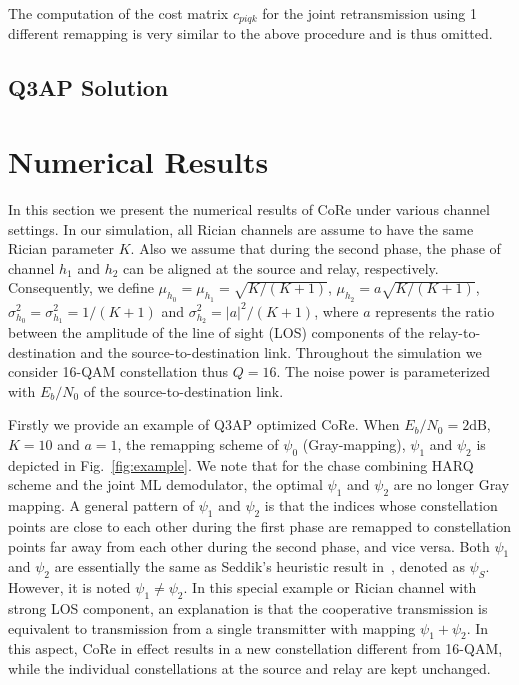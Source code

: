 \documentclass[conference]{IEEEtran}
\begin{document}
The computation of the cost matrix $c_{piqk}$ for the joint
retransmission using 1 different remapping is very similar to the above
procedure and is thus omitted.
\subsection{Q3AP Solution}

\section{Numerical Results}
\label{sec:simulation}
In this section we present the numerical results of CoRe under various channel
settings. In our simulation, all Rician channels are assume to have the same
Rician parameter $K$. Also we assume that during the second phase, the phase of
channel $h_1$ and $h_2$ can be aligned at the source and relay, respectively.
Consequently, we define $\mu_{h_0} = \mu_{h_1} = \sqrt{K/(K + 1)}$,
$\mu_{h_2}=a\sqrt{K/(K + 1)}$,  $\sigma_{h_0}^2 = \sigma_{h_1}^2 = 1/(K+1)$ and
$\sigma_{h_2}^2 = |a|^2/(K+1)$, where $a$ represents the ratio
between the amplitude of the line of sight (LOS) components of the
relay-to-destination and the source-to-destination link. Throughout the
simulation we consider 16-QAM constellation thus $Q=16$. The noise power is
parameterized with $E_b/N_0$ of the source-to-destination link.

Firstly we provide an example of Q3AP optimized CoRe. When $E_b/N_0 =
2\mbox{dB}$, $K = 10$ and $a = 1$, the remapping scheme of $\psi_0$
(Gray-mapping), $\psi_1$ and $\psi_2$ is depicted in Fig.~\ref{fig:example}. We
note that for the chase combining HARQ scheme and the joint ML demodulator, the
optimal $\psi_1$ and $\psi_2$ are no longer Gray mapping. A general pattern of
$\psi_1$ and $\psi_2$ is that the indices whose constellation points are close
to each other during the first phase are remapped to constellation points far
away from each other during the second phase, and vice versa. Both $\psi_1$ and
$\psi_2$ are essentially the same as Seddik's heuristic result
in~\cite{seddik2008trans}, denoted as $\psi_S$. However, it is noted
$\psi_1\not=\psi_2$.
In this special example or Rician channel with strong LOS component, an explanation is
that the cooperative transmission is equivalent to transmission from a single
transmitter with mapping $\psi_1+\psi_2$. In this aspect, CoRe in effect results
in a new constellation different from 16-QAM, while the individual
constellations at the source and relay are kept unchanged.
\end{document}
